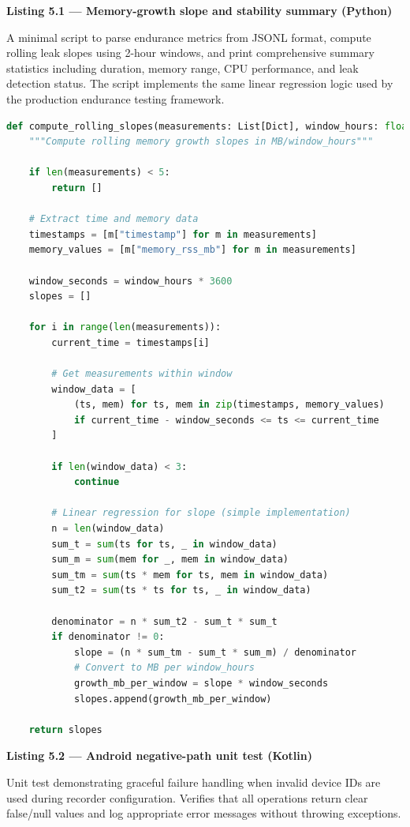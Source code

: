 \documentclass[12pt,a4paper]{article}
\begin{document}
\textbf{Listing 5.1 --- Memory-growth slope and stability summary (Python)}

A minimal script to parse endurance metrics from JSONL format, compute rolling leak slopes using 2-hour windows, and print comprehensive summary statistics including duration, memory range, CPU performance, and leak detection status. The script implements the same linear regression logic used by the production endurance testing framework.

\begin{lstlisting}[language=Python]
def compute_rolling_slopes(measurements: List[Dict], window_hours: float = 2.0) -> List[float]:
    """Compute rolling memory growth slopes in MB/window_hours"""
    
    if len(measurements) < 5:
        return []
    
    # Extract time and memory data
    timestamps = [m["timestamp"] for m in measurements]
    memory_values = [m["memory_rss_mb"] for m in measurements]
    
    window_seconds = window_hours * 3600
    slopes = []
    
    for i in range(len(measurements)):
        current_time = timestamps[i]
        
        # Get measurements within window
        window_data = [
            (ts, mem) for ts, mem in zip(timestamps, memory_values)
            if current_time - window_seconds <= ts <= current_time
        ]
        
        if len(window_data) < 3:
            continue
            
        # Linear regression for slope (simple implementation)
        n = len(window_data)
        sum_t = sum(ts for ts, _ in window_data)
        sum_m = sum(mem for _, mem in window_data)
        sum_tm = sum(ts * mem for ts, mem in window_data)
        sum_t2 = sum(ts * ts for ts, _ in window_data)
        
        denominator = n * sum_t2 - sum_t * sum_t
        if denominator != 0:
            slope = (n * sum_tm - sum_t * sum_m) / denominator
            # Convert to MB per window_hours
            growth_mb_per_window = slope * window_seconds
            slopes.append(growth_mb_per_window)
    
    return slopes
\end{lstlisting}

\textbf{Listing 5.2 --- Android negative-path unit test (Kotlin)}

Unit test demonstrating graceful failure handling when invalid device IDs are used during recorder configuration. Verifies that all operations return clear false/null values and log appropriate error messages without throwing exceptions.
\end{document}
